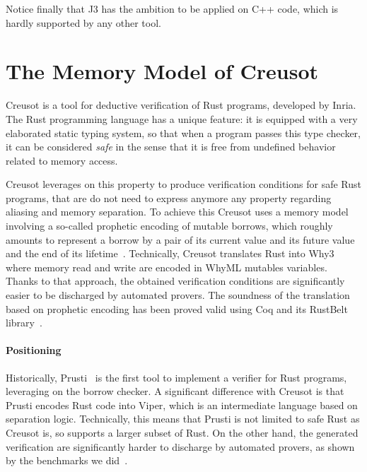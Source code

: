 \documentclass[a4paper,11pt]{article}
\begin{document}
Notice finally that J3 has the ambition to be applied on C++ code, which is
hardly supported by any other tool.

\section{The Memory Model of Creusot}
\label{sec:creusot}


Creusot is a tool for deductive verification of Rust programs, developed by
Inria. The Rust programming language has a unique feature: it is equipped with a
very elaborated static typing system, so that when a program passes this type
checker, it can be considered \emph{safe} in the sense that it is free from
undefined behavior related to memory access.

Creusot leverages on this property to produce verification conditions for safe
Rust programs, that are do not need to express anymore any property regarding
aliasing and memory separation. To achieve this Creusot uses a memory model
involving a so-called prophetic encoding of mutable borrows, which roughly
amounts to represent a borrow by a pair of its current value and its future
value and the end of its lifetime~\cite{denis22icfem,denis23phd}.  Technically,
Creusot translates Rust into Why3 where memory read and write are encoded in
WhyML mutables variables. Thanks to that approach, the obtained verification
conditions are significantly easier to be discharged by automated provers.  The
soundness of the translation based on prophetic encoding has been proved valid
using Coq and its RustBelt library~\cite{matsushita22pldi}.

\paragraph{Positioning}

Historically, Prusti~\cite{astrauskas19oopsla} is the first tool to implement a
verifier for Rust programs, leveraging on the borrow checker. A significant
difference with Creusot is that Prusti encodes Rust code into Viper, which is an
intermediate language based on separation logic. Technically, this means that
Prusti is not limited to safe Rust as Creusot is, so supports a larger subset of
Rust. On the other hand, the generated verification are significantly harder to
discharge by automated provers, as shown by the benchmarks we
did~\cite{denis23phd}.
\end{document}
